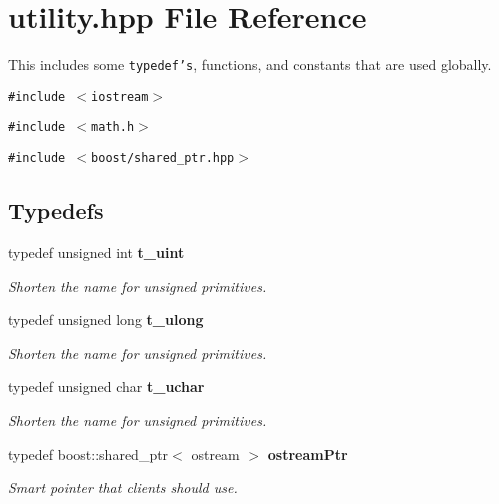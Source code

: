 \section{utility.hpp File Reference}
\label{utility_8hpp}
This includes some {\tt typedef's}, functions, and constants that are used globally. 

{\tt \#include $<$iostream$>$}\par
{\tt \#include $<$math.h$>$}\par
{\tt \#include $<$boost/shared\_\-ptr.hpp$>$}\par
\subsection*{Typedefs}
\begin{CompactItemize}
\item 
typedef unsigned int \bf{t\_\-uint}\label{utility_8hpp_b393a696e0318c8ab53ae2a1592e3770}

\begin{CompactList}\small\item\em Shorten the name for unsigned primitives. \item\end{CompactList}\item 
typedef unsigned long \bf{t\_\-ulong}\label{utility_8hpp_53477cde5ad1c263a6a3183c0756808e}

\begin{CompactList}\small\item\em Shorten the name for unsigned primitives. \item\end{CompactList}\item 
typedef unsigned char \bf{t\_\-uchar}\label{utility_8hpp_0a4a98abf39e826ef67f8c547f3c9be5}

\begin{CompactList}\small\item\em Shorten the name for unsigned primitives. \item\end{CompactList}\item 
typedef boost::shared\_\-ptr$<$ ostream $>$ \bf{ostream\-Ptr}\label{utility_8hpp_80994bec368911c9409385effc01c3d0}

\begin{CompactList}\small\item\em Smart pointer that clients should use. \item\end{CompactList}\end{CompactItemize}
